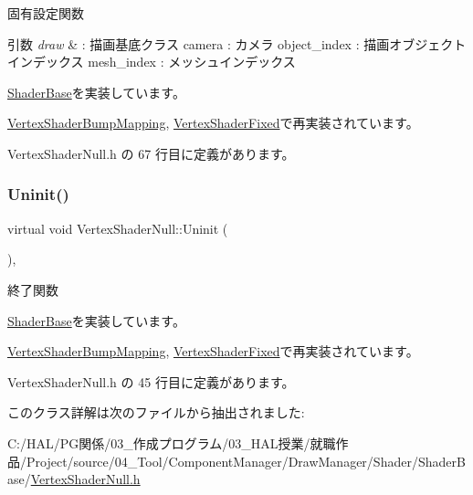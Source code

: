 固有設定関数 


\begin{DoxyParams}{引数}
{\em draw} & \+: 描画基底クラス camera \+: カメラ object\+\_\+index \+: 描画オブジェクトインデックス mesh\+\_\+index \+: メッシュインデックス \\
\hline
\end{DoxyParams}


\mbox{\hyperlink{class_shader_base_ac78c78ede3b8e48cf28b739b97456620}{Shader\+Base}}を実装しています。



\mbox{\hyperlink{class_vertex_shader_bump_mapping_ad81d57336763441c4071f967b57dbce1}{Vertex\+Shader\+Bump\+Mapping}}, \mbox{\hyperlink{class_vertex_shader_fixed_a87523c320f6f6767d59d7b24265db7ec}{Vertex\+Shader\+Fixed}}で再実装されています。



 Vertex\+Shader\+Null.\+h の 67 行目に定義があります。

\mbox{\label{class_vertex_shader_null_a16334df4ac02db3dd63f042622032301}} 
\subsubsection{\texorpdfstring{Uninit()}{Uninit()}}
{\footnotesize\ttfamily virtual void Vertex\+Shader\+Null\+::\+Uninit (\begin{DoxyParamCaption}{ }\end{DoxyParamCaption})\hspace{0.3cm}{\ttfamily [inline]}, {\ttfamily [virtual]}}



終了関数 



\mbox{\hyperlink{class_shader_base_a784edfa81bec4d08a257ed4f02c61222}{Shader\+Base}}を実装しています。



\mbox{\hyperlink{class_vertex_shader_bump_mapping_abed4e0aa9655fa7a7a21e03d00e7c0e5}{Vertex\+Shader\+Bump\+Mapping}}, \mbox{\hyperlink{class_vertex_shader_fixed_a49f630aee4757c8fd8bae886f22dfeb0}{Vertex\+Shader\+Fixed}}で再実装されています。



 Vertex\+Shader\+Null.\+h の 45 行目に定義があります。



このクラス詳解は次のファイルから抽出されました\+:\begin{DoxyCompactItemize}
\item 
C\+:/\+H\+A\+L/\+P\+G関係/03\+\_\+作成プログラム/03\+\_\+\+H\+A\+L授業/就職作品/\+Project/source/04\+\_\+\+Tool/\+Component\+Manager/\+Draw\+Manager/\+Shader/\+Shader\+Base/\mbox{\hyperlink{_vertex_shader_null_8h}{Vertex\+Shader\+Null.\+h}}\end{DoxyCompactItemize}
